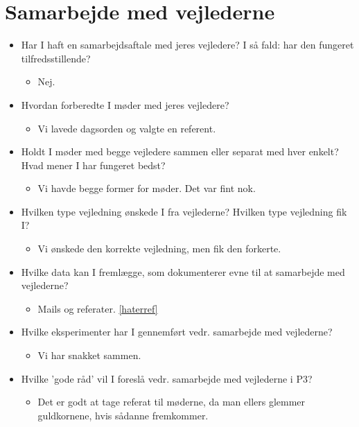 \chapter{Samarbejde med vejlederne}
\label{H8R}

\begin{itemize}
\item Har I haft en samarbejdsaftale med jeres vejledere? I så fald: har den fungeret tilfredsstillende?
\begin{itemize}
	\item Nej.
\end{itemize}

\item Hvordan forberedte I møder med jeres vejledere?
\begin{itemize}
	\item Vi lavede dagsorden og valgte en referent.
\end{itemize}

\item Holdt I møder med begge vejledere sammen eller separat med hver enkelt? Hvad mener I har fungeret bedst?
\begin{itemize}
	\item Vi havde begge former for møder. Det var fint nok.
\end{itemize}

\item Hvilken type vejledning ønskede I fra vejlederne? Hvilken type vejledning fik I?
\begin{itemize}
	\item Vi ønskede den korrekte vejledning, men fik den forkerte.
\end{itemize}

\item Hvilke data kan I fremlægge, som dokumenterer evne til at samarbejde med vejlederne?
\begin{itemize}
	\item Mails og referater. \ref{haterref}
\end{itemize}

\item Hvilke eksperimenter har I gennemført vedr. samarbejde med vejlederne?
\begin{itemize}
	\item Vi har snakket sammen.
\end{itemize}

\item Hvilke ’gode råd’ vil I foreslå vedr. samarbejde med vejlederne i P3?
\begin{itemize}
	\item Det er godt at tage referat til møderne, da man ellers glemmer guldkornene, hvis sådanne fremkommer.
\end{itemize}

\end{itemize}